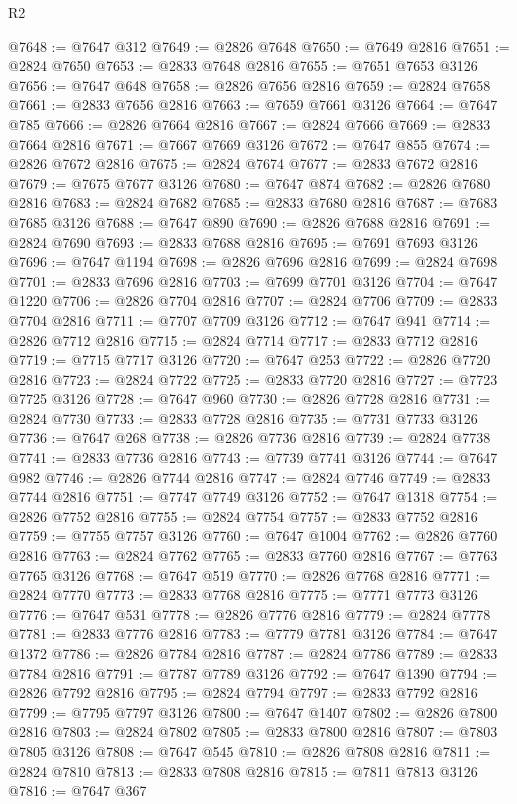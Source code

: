 \begin{lexlean}{R2}
\begin{coremodule}
@7648 := @7647 @312
@7649 := @2826 @7648
@7650 := @7649 @2816
@7651 := @2824 @7650
@7653 := @2833 @7648 @2816
@7655 := @7651 @7653 @3126
@7656 := @7647 @648
@7658 := @2826 @7656 @2816
@7659 := @2824 @7658
@7661 := @2833 @7656 @2816
@7663 := @7659 @7661 @3126
@7664 := @7647 @785
@7666 := @2826 @7664 @2816
@7667 := @2824 @7666
@7669 := @2833 @7664 @2816
@7671 := @7667 @7669 @3126
@7672 := @7647 @855
@7674 := @2826 @7672 @2816
@7675 := @2824 @7674
@7677 := @2833 @7672 @2816
@7679 := @7675 @7677 @3126
@7680 := @7647 @874
@7682 := @2826 @7680 @2816
@7683 := @2824 @7682
@7685 := @2833 @7680 @2816
@7687 := @7683 @7685 @3126
@7688 := @7647 @890
@7690 := @2826 @7688 @2816
@7691 := @2824 @7690
@7693 := @2833 @7688 @2816
@7695 := @7691 @7693 @3126
@7696 := @7647 @1194
@7698 := @2826 @7696 @2816
@7699 := @2824 @7698
@7701 := @2833 @7696 @2816
@7703 := @7699 @7701 @3126
@7704 := @7647 @1220
@7706 := @2826 @7704 @2816
@7707 := @2824 @7706
@7709 := @2833 @7704 @2816
@7711 := @7707 @7709 @3126
@7712 := @7647 @941
@7714 := @2826 @7712 @2816
@7715 := @2824 @7714
@7717 := @2833 @7712 @2816
@7719 := @7715 @7717 @3126
@7720 := @7647 @253
@7722 := @2826 @7720 @2816
@7723 := @2824 @7722
@7725 := @2833 @7720 @2816
@7727 := @7723 @7725 @3126
@7728 := @7647 @960
@7730 := @2826 @7728 @2816
@7731 := @2824 @7730
@7733 := @2833 @7728 @2816
@7735 := @7731 @7733 @3126
@7736 := @7647 @268
@7738 := @2826 @7736 @2816
@7739 := @2824 @7738
@7741 := @2833 @7736 @2816
@7743 := @7739 @7741 @3126
@7744 := @7647 @982
@7746 := @2826 @7744 @2816
@7747 := @2824 @7746
@7749 := @2833 @7744 @2816
@7751 := @7747 @7749 @3126
@7752 := @7647 @1318
@7754 := @2826 @7752 @2816
@7755 := @2824 @7754
@7757 := @2833 @7752 @2816
@7759 := @7755 @7757 @3126
@7760 := @7647 @1004
@7762 := @2826 @7760 @2816
@7763 := @2824 @7762
@7765 := @2833 @7760 @2816
@7767 := @7763 @7765 @3126
@7768 := @7647 @519
@7770 := @2826 @7768 @2816
@7771 := @2824 @7770
@7773 := @2833 @7768 @2816
@7775 := @7771 @7773 @3126
@7776 := @7647 @531
@7778 := @2826 @7776 @2816
@7779 := @2824 @7778
@7781 := @2833 @7776 @2816
@7783 := @7779 @7781 @3126
@7784 := @7647 @1372
@7786 := @2826 @7784 @2816
@7787 := @2824 @7786
@7789 := @2833 @7784 @2816
@7791 := @7787 @7789 @3126
@7792 := @7647 @1390
@7794 := @2826 @7792 @2816
@7795 := @2824 @7794
@7797 := @2833 @7792 @2816
@7799 := @7795 @7797 @3126
@7800 := @7647 @1407
@7802 := @2826 @7800 @2816
@7803 := @2824 @7802
@7805 := @2833 @7800 @2816
@7807 := @7803 @7805 @3126
@7808 := @7647 @545
@7810 := @2826 @7808 @2816
@7811 := @2824 @7810
@7813 := @2833 @7808 @2816
@7815 := @7811 @7813 @3126
@7816 := @7647 @367

\end{coremodule}
\end{lexlean}
